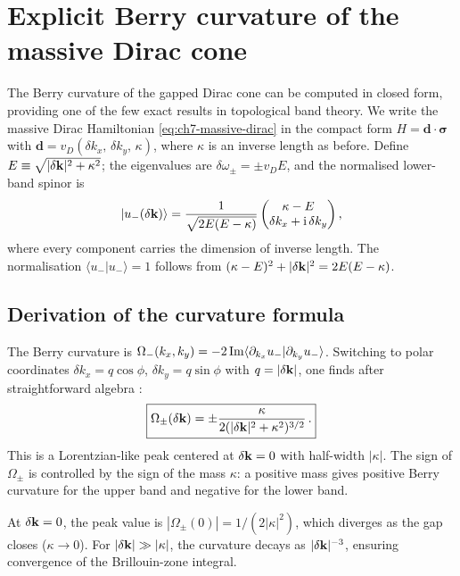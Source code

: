 \section{Explicit Berry curvature of the massive Dirac cone}
\label{sec:ch7-berry-explicit}

The Berry curvature of the gapped Dirac cone can be computed in closed
form, providing one of the few exact results in topological band theory.
We write the massive Dirac Hamiltonian \eqref{eq:ch7-massive-dirac}
in the compact form $H=\mathbf{d}\cdot\boldsymbol{\sigma}$ with
$\mathbf{d}=v_D(\delta k_x,\,\delta k_y,\,\kappa)$, where $\kappa$
is an inverse length as before.  Define
$E\equiv\sqrt{|\delta\mathbf{k}|^2+\kappa^2}$; the eigenvalues are
$\delta\omega_\pm=\pm v_D E$, and the normalised lower-band
spinor is
\begin{equation}\label{eq:ch7-lower-eigenstate}
  |u_-(\delta\mathbf{k})\rangle
  = \frac{1}{\sqrt{2E(E-\kappa)}}
  \begin{pmatrix}
    \kappa - E \\
    \delta k_x + \mathrm{i}\,\delta k_y
  \end{pmatrix},
\end{equation}
where every component carries the dimension of inverse length.
The normalisation $\langle u_-|u_-\rangle=1$ follows from
$(\kappa-E)^2+|\delta\mathbf{k}|^2=2E(E-\kappa)$.

\subsection{Derivation of the curvature formula}
\label{sec:ch7-curvature-derivation}

The Berry curvature is
$\Omega_-(k_x,k_y)
= -2\,\mathrm{Im}\langle\partial_{k_x}u_-|\partial_{k_y}u_-\rangle$.
Switching to polar coordinates $\delta k_x=q\cos\phi$,
$\delta k_y=q\sin\phi$ with $q=|\delta\mathbf{k}|$, one finds after
straightforward algebra \cite{ozawa2018topological}:
\begin{equation}\label{eq:ch7-berry-curvature-exact}
  \boxed{%
  \Omega_\pm(\delta\kvec)
  = \pm\frac{\kappa}
  {2(|\delta\kvec|^2+\kappa^2)^{3/2}}\,.}
\end{equation}
This is a Lorentzian-like peak centered at $\delta\mathbf{k}=0$ with
half-width $|\kappa|$.  The sign of $\Omega_\pm$ is controlled by
the sign of the mass $\kappa$: a positive mass gives positive Berry
curvature for the upper band and negative for the lower band.

At $\delta\mathbf{k}=0$, the peak value is
$|\Omega_\pm(0)|=1/(2|\kappa|^2)$, which diverges as the gap
closes ($\kappa\to 0$).  For $|\delta\mathbf{k}|\gg|\kappa|$, the
curvature decays as $|\delta\mathbf{k}|^{-3}$, ensuring convergence of
the Brillouin-zone integral.

